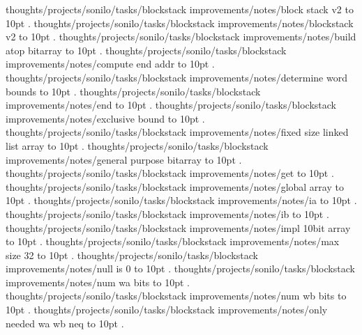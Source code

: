 \smallskip
thoughts/projects/sonilo/tasks/blockstack improvements/notes/block stack v2 \leaders\hbox to 10pt {\hss.\hss}  \hfill {}
\smallskip
thoughts/projects/sonilo/tasks/blockstack improvements/notes/blockstack v2 \leaders\hbox to 10pt {\hss.\hss}  \hfill {}
\smallskip
thoughts/projects/sonilo/tasks/blockstack improvements/notes/build atop bitarray \leaders\hbox to 10pt {\hss.\hss}  \hfill {}
\smallskip
thoughts/projects/sonilo/tasks/blockstack improvements/notes/compute end addr \leaders\hbox to 10pt {\hss.\hss}  \hfill {}
\smallskip
thoughts/projects/sonilo/tasks/blockstack improvements/notes/determine word bounds \leaders\hbox to 10pt {\hss.\hss}  \hfill {}
\smallskip
thoughts/projects/sonilo/tasks/blockstack improvements/notes/end \leaders\hbox to 10pt {\hss.\hss}  \hfill {}
\smallskip
thoughts/projects/sonilo/tasks/blockstack improvements/notes/exclusive bound \leaders\hbox to 10pt {\hss.\hss}  \hfill {}
\smallskip
thoughts/projects/sonilo/tasks/blockstack improvements/notes/fixed size linked list array \leaders\hbox to 10pt {\hss.\hss}  \hfill {}
\smallskip
thoughts/projects/sonilo/tasks/blockstack improvements/notes/general purpose bitarray \leaders\hbox to 10pt {\hss.\hss}  \hfill {}
\smallskip
thoughts/projects/sonilo/tasks/blockstack improvements/notes/get \leaders\hbox to 10pt {\hss.\hss}  \hfill {}
\smallskip
thoughts/projects/sonilo/tasks/blockstack improvements/notes/global array \leaders\hbox to 10pt {\hss.\hss}  \hfill {}
\smallskip
thoughts/projects/sonilo/tasks/blockstack improvements/notes/ia \leaders\hbox to 10pt {\hss.\hss}  \hfill {}
\smallskip
thoughts/projects/sonilo/tasks/blockstack improvements/notes/ib \leaders\hbox to 10pt {\hss.\hss}  \hfill {}
\smallskip
thoughts/projects/sonilo/tasks/blockstack improvements/notes/impl 10bit array \leaders\hbox to 10pt {\hss.\hss}  \hfill {}
\smallskip
thoughts/projects/sonilo/tasks/blockstack improvements/notes/max size 32 \leaders\hbox to 10pt {\hss.\hss}  \hfill {}
\smallskip
thoughts/projects/sonilo/tasks/blockstack improvements/notes/null is 0 \leaders\hbox to 10pt {\hss.\hss}  \hfill {}
\smallskip
thoughts/projects/sonilo/tasks/blockstack improvements/notes/num wa bits \leaders\hbox to 10pt {\hss.\hss}  \hfill {}
\smallskip
thoughts/projects/sonilo/tasks/blockstack improvements/notes/num wb bits \leaders\hbox to 10pt {\hss.\hss}  \hfill {}
\smallskip
thoughts/projects/sonilo/tasks/blockstack improvements/notes/only needed wa wb neq \leaders\hbox to 10pt {\hss.\hss}  \hfill {}
